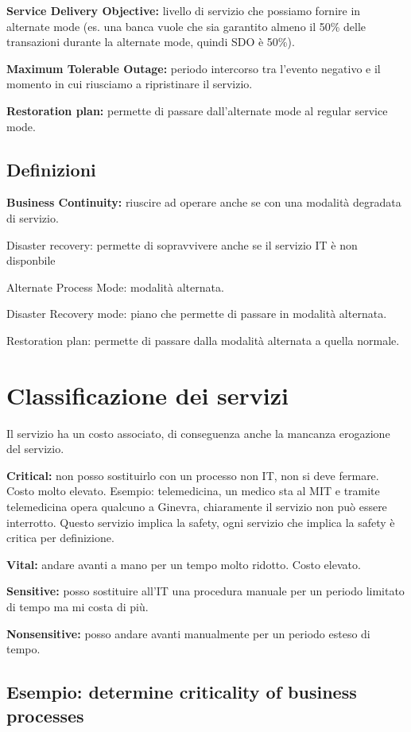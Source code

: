 \textbf{Service Delivery Objective:} livello di servizio che possiamo fornire 
in alternate mode (es. una banca vuole che sia garantito almeno il 50\% delle 
transazioni durante la alternate mode, quindi SDO è 50\%).

\textbf{Maximum Tolerable Outage:} periodo intercorso tra l'evento negativo e 
il momento in cui riusciamo a ripristinare il servizio.

\textbf{Restoration plan:} permette di passare dall'alternate mode al regular 
service mode.

\subsection{Definizioni}

\textbf{Business Continuity:} riuscire ad operare anche se con una modalità 
degradata di servizio.

Disaster recovery: permette di sopravvivere anche se il servizio IT è non 
disponbile

Alternate Process Mode: modalità alternata.

Disaster Recovery mode: piano che permette di passare in modalità alternata.

Restoration plan: permette di passare dalla modalità alternata a quella normale.

\section{Classificazione dei servizi}

Il servizio ha un costo associato, di conseguenza anche la mancanza erogazione 
del servizio.

\textbf{Critical:} non posso sostituirlo con un processo non IT, non si deve 
fermare. Costo molto elevato. Esempio: telemedicina, un medico sta al MIT e 
tramite telemedicina opera qualcuno a Ginevra, chiaramente il servizio non può 
essere interrotto. Questo servizio implica la safety, ogni servizio che implica 
la safety è critica per definizione.

\textbf{Vital:} andare avanti a mano per un tempo molto ridotto. Costo elevato.

\textbf{Sensitive:} posso sostituire all'IT una procedura manuale per un 
periodo limitato di tempo ma mi costa di più.

\textbf{Nonsensitive:} posso andare avanti manualmente per un periodo esteso di 
tempo.

\subsection{Esempio: determine criticality of business processes}

